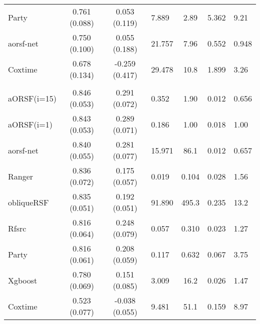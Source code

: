 \documentclass[twoside,11pt]{article}\usepackage[]{graphicx}\usepackage[]{color}
\newenvironment{knitrout}{}{} %
\begin{document}
\begin{knitrout}
\begin{longtable}{lcclccl}
\hspace{1em}Party & 0.761 (0.088) & 0.053 (0.119) & 7.889 & 2.89 & 5.362 & 9.21\\
\hspace{1em}aorsf-net & 0.750 (0.100) & 0.055 (0.188) & 21.757 & 7.96 & 0.552 & 0.948\\
\hspace{1em}Coxtime & 0.678 (0.134) & -0.259 (0.417) & 29.478 & 10.8 & 1.899 & 3.26\\
\addlinespace[0.3em]
\hline
\multicolumn{7}{l}{\textit{\textbf{veteran}}}\\
\hline
\hspace{1em}aORSF(i=15) & 0.846 (0.053) & 0.291 (0.072) & 0.352 & 1.90 & 0.012 & 0.656\\
\hspace{1em}aORSF(i=1) & 0.843 (0.053) & 0.289 (0.071) & 0.186 & 1.00 & 0.018 & 1.00\\
\hspace{1em}aorsf-net & 0.840 (0.055) & 0.281 (0.077) & 15.971 & 86.1 & 0.012 & 0.657\\
\hspace{1em}Ranger & 0.836 (0.072) & 0.175 (0.057) & 0.019 & 0.104 & 0.028 & 1.56\\
\hspace{1em}obliqueRSF & 0.835 (0.051) & 0.192 (0.051) & 91.890 & 495.3 & 0.235 & 13.2\\
\hspace{1em}Rfsrc & 0.816 (0.064) & 0.248 (0.079) & 0.057 & 0.310 & 0.023 & 1.27\\
\hspace{1em}Party & 0.816 (0.061) & 0.208 (0.059) & 0.117 & 0.632 & 0.067 & 3.75\\
\hspace{1em}Xgboost & 0.780 (0.069) & 0.151 (0.085) & 3.009 & 16.2 & 0.026 & 1.47\\
\hspace{1em}Coxtime & 0.523 (0.077) & -0.038 (0.055) & 9.481 & 51.1 & 0.159 & 8.97\\*
\end{longtable}

\end{knitrout}



\end{document}
